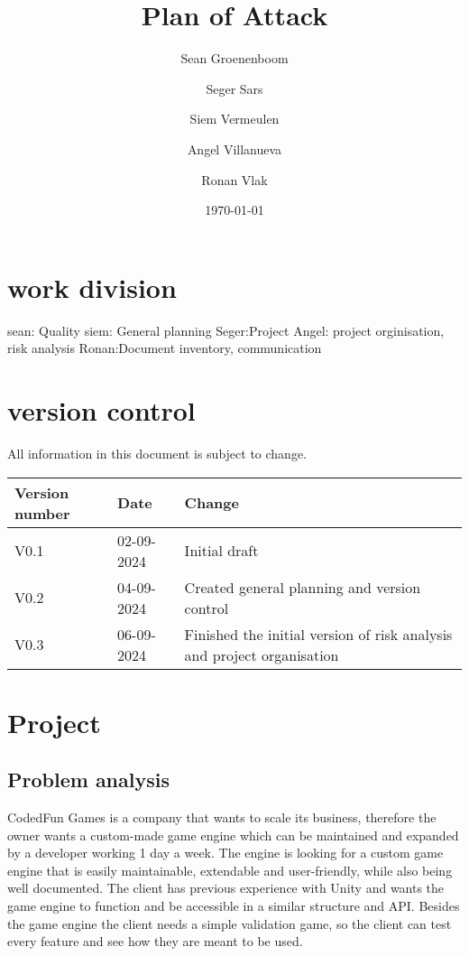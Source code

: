 \documentclass{article} %
\title{Plan of Attack} %
\author{Sean Groenenboom \and Seger Sars \and Siem Vermeulen \and Angel Villanueva \and Ronan Vlak} %
\date{\today} %
\begin{document}
\maketitle %
\newpage

\tableofcontents %
\newpage

\section{work division}
sean: Quality
siem: General planning
Seger:Project
Angel: project orginisation, risk analysis
Ronan:Document inventory, communication
\newpage

\section{version control}
All information in this document is subject to change. \\
\begin{tabularx}{\textwidth}{|X|X|X|}
    \hline
    \textbf{Version number} & \textbf{Date} & \textbf{Change}                                                        \\ \hline
    V0.1                    & 02-09-2024    & Initial draft                                                          \\ \hline
    V0.2                    & 04-09-2024    & Created general planning and version control                           \\ \hline
    V0.3                    & 06-09-2024    & Finished the initial version of risk analysis and project organisation \\ \hline
\end{tabularx}
\newpage

\section{Project}
\subsection{Problem analysis}
CodedFun Games is a company that wants to scale its business, therefore
the owner wants a custom-made game engine which can be maintained and expanded by a developer working 1 day a week.
The engine is looking for a custom game engine that is easily maintainable, extendable and user-friendly, while also being well documented.
The client has previous experience with Unity and wants the game engine to function and be accessible in a similar structure and API.
\newline \newline
Besides the game engine the client needs a simple validation game, so the client can test every feature and see how they are meant to be used.
\end{document}
